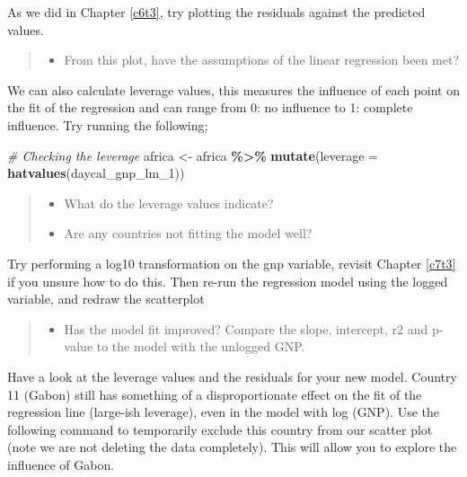\documentclass[
]{book}
\newenvironment{Shaded}{\begin{snugshade}}{\end{snugshade}}
\newcommand{\AttributeTok}[1]{\textcolor[rgb]{0.13,0.29,0.53}{#1}}
\newcommand{\CommentTok}[1]{\textcolor[rgb]{0.56,0.35,0.01}{\textit{#1}}}
\newcommand{\FunctionTok}[1]{\textcolor[rgb]{0.13,0.29,0.53}{\textbf{#1}}}
\newcommand{\NormalTok}[1]{#1}
\newcommand{\OtherTok}[1]{\textcolor[rgb]{0.56,0.35,0.01}{#1}}
\newcommand{\SpecialCharTok}[1]{\textcolor[rgb]{0.81,0.36,0.00}{\textbf{#1}}}
\providecommand{\tightlist}{%
  \setlength{\itemsep}{0pt}\setlength{\parskip}{0pt}}
\begin{document}
As we did in Chapter \ref{c6t3}, try plotting the residuals against the predicted values.

\begin{quote}
\begin{itemize}
\tightlist
\item
  From this plot, have the assumptions of the linear regression been met?
\end{itemize}
\end{quote}

We can also calculate leverage values, this measures the influence of each point on the fit of the regression and can range from 0: no influence to 1: complete influence. Try running the following;

\begin{Shaded}
\begin{Highlighting}[]
\CommentTok{\# Checking the leverage }
\NormalTok{africa }\OtherTok{\textless{}{-}}\NormalTok{ africa }\SpecialCharTok{\%\textgreater{}\%}
  \FunctionTok{mutate}\NormalTok{(}\AttributeTok{leverage =} \FunctionTok{hatvalues}\NormalTok{(daycal\_gnp\_lm\_1))}
\end{Highlighting}
\end{Shaded}

\begin{quote}
\begin{itemize}
\tightlist
\item
  What do the leverage values indicate?
\item
  Are any countries not fitting the model well?
\end{itemize}
\end{quote}

Try performing a log10 transformation on the gnp variable, revisit Chapter \ref{c7t3} if you unsure how to do this. Then re-run the regression model using the logged variable, and redraw the scatterplot

\begin{quote}
\begin{itemize}
\tightlist
\item
  Has the model fit improved? Compare the slope, intercept, r\(2\) and p-value to the model with the unlogged GNP.
\end{itemize}
\end{quote}

Have a look at the leverage values and the residuals for your new model. Country 11 (Gabon) still has something of a disproportionate effect on the fit of the regression line (large-ish leverage), even in the model with log (GNP). Use the following command to temporarily exclude this country from our scatter plot (note we are not deleting the data completely). This will allow you to explore the influence of Gabon.
\end{document}
